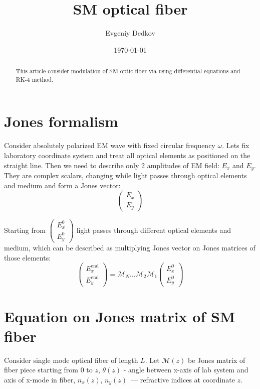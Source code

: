 \documentclass[12pt, notitlepage]{report}
\title{SM optical fiber}
\author{Evgeniy Dedkov}
\date{\today}
\begin{document}
	
	\newcommand\scalemath[2]{\scalebox{#1}{\mbox{\ensuremath{\displaystyle #2}}}}
	\newcommand{\mcm}{\mathcal{M}}
	
	\maketitle
	\thispagestyle{empty}
	
	\begin{abstract}
		This article consider modulation of SM optic fiber via using differential equations and RK-4 method.
	\end{abstract}
	
	\section{Jones formalism}
	Consider absolutely polarized EM wave with fixed circular frequency $\omega$. Lets fix laboratory coordinate system and treat all optical elements as positioned on the straight line. Then we need to describe only 2 amplitudes of EM field: $E_x$ and $E_y$. They are complex scalars, changing while light passes through optical elements and medium and form a Jones vector:
	$$
	\begin{pmatrix}
		E_x \\
		E_y
	\end{pmatrix}
	$$
	
	Starting from $
	\begin{pmatrix}
		E_{x}^0 \\
		E_{y}^0
	\end{pmatrix}
	$ light passes through different optical elements and medium, which can be described as multiplying Jones vector on Jones matrices of those elements:
	$$
		\begin{pmatrix}
		E_{x}^\text{end} \\
		E_y^\text{end}
	\end{pmatrix} = \mathcal{M}_N\dots\mathcal{M}_2\mathcal{M}_1\begin{pmatrix}
	E_{x}^0 \\
	E_{y}^0
\end{pmatrix}
	$$
	\section{Equation on Jones matrix of SM fiber}
	Consider single mode optical fiber of length $L$. Let $\mathcal{M}(z)$ be Jones matrix of fiber piece starting from 0 to $z$, $\theta(z)$ - angle between x-axis of lab system and axis of x-mode in fiber, $n_x(z)$, $n_y(z)$~--- refractive indices at coordinate $z$. 
	
\end{document}
